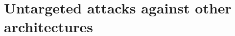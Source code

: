 \begin{subappendices}
\begin{table}[htb]
\begin{center}
\begin{tabular}{c|cc|cc|c}
\hline

\end{tabular}
\end{center}
\end{table}


\newpage


\section{Untargeted attacks against other architectures}
\label{other_archi}


\end{subappendices}
